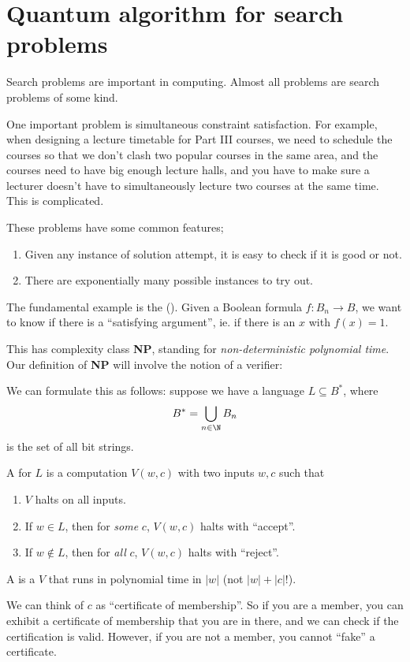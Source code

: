 \documentclass[a4paper]{article}
\begin{document}
\section{Quantum algorithm for search problems}
Search problems are important in computing. Almost all problems are search problems of some kind.

One important problem is simultaneous constraint satisfaction. For example, when designing a lecture timetable for Part III courses, we need to schedule the courses so that we don't clash two popular courses in the same area, and the courses need to have big enough lecture halls, and you have to make sure a lecturer doesn't have to simultaneously lecture two courses at the same time. This is complicated.

These problems have some common features;
\begin{enumerate}
  \item Given any instance of solution attempt, it is easy to check if it is good or not.
  \item There are exponentially many possible instances to try out.
\end{enumerate}

The fundamental example is the  (). Given a Boolean formula $f: B_n \to B$, we want to know if there is a ``satisfying argument'', ie. if there is an $x$ with $f(x) = 1$.

This has complexity class \textbf{NP}, standing for \emph{non-deterministic polynomial time}. Our definition of \textbf{NP} will involve the notion of a verifier:

\begin{defi}[Verifier]
  We can formulate this as follows: suppose we have a language $L \subseteq B^*$, where
  \[
    B^* = \bigcup_{n \in \N} B_n
  \]
  is the set of all bit strings.

  A  for $L$ is a computation $V(w, c)$ with two inputs $w, c$ such that
  \begin{enumerate}
    \item $V$ halts on all inputs.
    \item If $w \in L$, then for \emph{some} $c$, $V(w, c)$ halts with ``accept''.
    \item If $w \not\in L$, then for \emph{all} $c$, $V(w, c)$ halts with ``reject''.
  \end{enumerate}
  A  is a $V$ that runs in polynomial time in $|w|$ (not $|w| + |c|!$).
\end{defi}
We can think of $c$ as ``certificate of membership''. So if you are a member, you can exhibit a certificate of membership that you are in there, and we can check if the certification is valid. However, if you are not a member, you cannot ``fake'' a certificate.
\end{document}
